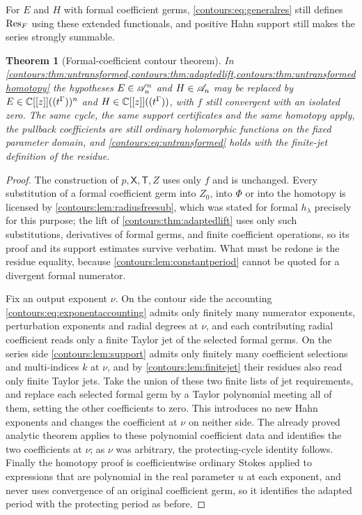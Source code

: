 \documentclass[11pt,letterpaper]{article}
\newtheorem{theorem}{Theorem}[section]
\theoremstyle{definition}
\theoremstyle{remark}
\numberwithin{equation}{section}
\begin{document}
For $E$ and $H$ with formal coefficient germs, \eqref{contours:eq:generalres}
still defines $\operatorname{Res}_F$ using these extended functionals, and positive Hahn
support still makes the series strongly summable.

\begin{theorem}[Formal-coefficient contour theorem]
\label{contours:thm:formalcontour}
In \cref{contours:thm:untransformed,contours:thm:adaptedlift,contours:thm:untransformedhomotopy}
the hypotheses $E\in\mathscr A_n^n$ and $H\in\mathscr A_n$ may be replaced by
$E\in\mathbb C[[z]]((t^\Gamma))^n$ and $H\in\mathbb C[[z]]((t^\Gamma))$, with $f$ still
convergent with an isolated zero. The same cycle, the same support certificates
and the same homotopy apply, the pullback coefficients are still ordinary
holomorphic functions on the fixed parameter domain, and
\eqref{contours:eq:untransformed} holds with the finite-jet definition of the
residue.
\end{theorem}
\begin{proof}
The construction of $p,\mathsf X,\mathsf T,Z$ uses only $f$ and is unchanged.
Every substitution of a formal coefficient germ into $Z_0$, into $\Phi$ or into
the homotopy is licensed by \cref{contours:lem:radiusfreesub}, which was stated
for formal $h_\lambda$ precisely for this purpose; the lift of
\cref{contours:thm:adaptedlift} uses only such substitutions, derivatives of
formal germs, and finite coefficient operations, so its proof and its support
estimates survive verbatim. What must be redone is the residue equality, because
\cref{contours:lem:constantperiod} cannot be quoted for a divergent formal
numerator.

Fix an output exponent $\nu$. On the contour side the accounting
\eqref{contours:eq:exponentaccounting} admits only finitely many numerator
exponents, perturbation exponents and radial degrees at $\nu$, and each
contributing radial coefficient reads only a finite Taylor jet of the selected
formal germs. On the series side \cref{contours:lem:support} admits only finitely
many coefficient selections and multi-indices $k$ at $\nu$, and by
\cref{contours:lem:finitejet} their residues also read only finite Taylor jets.
Take the union of these two finite lists of jet requirements, and replace each
selected formal germ by a Taylor polynomial meeting all of them, setting the
other coefficients to zero. This introduces no new Hahn exponents and changes the
coefficient at $\nu$ on neither side. The already proved analytic theorem applies
to these polynomial coefficient data and identifies the two coefficients at
$\nu$; as $\nu$ was arbitrary, the protecting-cycle identity follows. Finally the
homotopy proof is coefficientwise ordinary Stokes applied to expressions that are
polynomial in the real parameter $u$ at each exponent, and never uses convergence
of an original coefficient germ, so it identifies the adapted period with the
protecting period as before.
\end{proof}
\end{document}
